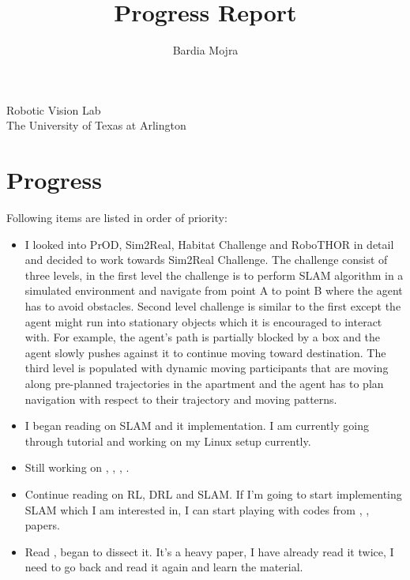 \documentclass[11pt]{article}
\title{Progress Report}
\author{Bardia Mojra}
\begin{document}
	\maketitle
	\thispagestyle{empty}

\begin{center}
\bigskip
\bigskip
 Robotic Vision Lab \\
 The University of Texas at Arlington\\
\end{center}

\newpage 

\section{Progress}
Following items are listed in order of priority: 
\begin{itemize}  
	
  \item I looked into PrOD, Sim2Real, Habitat Challenge and RoboTHOR in detail and decided to work towards Sim2Real Challenge. The challenge consist of three levels, in the first level the challenge is to perform SLAM algorithm in a simulated environment and navigate from point A to point B where the agent has to avoid obstacles. Second level challenge is similar to the first except the agent might run into stationary objects which it is encouraged to interact with. For example, the agent's path is partially blocked by a box and the agent slowly pushes against it to continue moving toward destination. The third level is populated with dynamic moving participants that are moving along pre-planned trajectories in the apartment and the agent has to plan navigation with respect to their trajectory and moving patterns. 
  
  \item I began reading on SLAM and it implementation. I am currently going through tutorial and working on my Linux setup currently. 
  
  \item Still working on \cite{PanopticSeg2019}, \cite{SVO}, \cite{HornsMethod}, \cite{NYUV2}.
  
  \item Continue reading on RL, DRL and SLAM. If I'm going to start implementing SLAM which I am interested in, I can start playing with codes from \cite{PanopticSeg2019}, \cite{SVO}, \cite{NYUV2} papers. 
  
  \item Read \cite{DGCNNLPC}, began to dissect it. It's a heavy paper, I have already read it twice, I need to go back and read it again and learn the material. 
  

\end{itemize}
\end{document}
